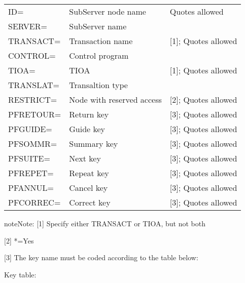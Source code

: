 \documentclass[letterpaper,10pt,english]{sphinxmanual}
\begin{document}
\begin{savenotes}\sphinxattablestart
\centering
\begin{tabulary}{\linewidth}[t]{|T|T|T|}
\hline
{}\relax &\relax &\relax \\
\hline
ID=
&
SubServer node name
&
Quotes allowed
\\
\hline
SERVER=
&
SubServer name
&\\
\hline
TRANSACT=
&
Transaction name
&
{[}1{]}; Quotes allowed
\\
\hline
CONTROL=
&
Control program
&\\
\hline
TIOA=
&
TIOA
&
{[}1{]}; Quotes allowed
\\
\hline
TRANSLAT=
&
Transaltion type
&\\
\hline
RESTRICT=
&
Node with reserved
access
&
{[}2{]}; Quotes allowed
\\
\hline
PFRETOUR=
&
Return key
&
{[}3{]}; Quotes allowed
\\
\hline
PFGUIDE=
&
Guide key
&
{[}3{]}; Quotes allowed
\\
\hline
PFSOMMR=
&
Summary key
&
{[}3{]}; Quotes allowed
\\
\hline
PFSUITE=
&
Next key
&
{[}3{]}; Quotes allowed
\\
\hline
PFREPET=
&
Repeat key
&
{[}3{]}; Quotes allowed
\\
\hline
PFANNUL=
&
Cancel key
&
{[}3{]}; Quotes allowed
\\
\hline
PFCORREC=
&
Correct key
&
{[}3{]}; Quotes allowed
\\
\hline
\end{tabulary}
\par
\sphinxattableend\end{savenotes}

\begin{sphinxadmonition}{note}{Note:}
{[}1{]}  Specify either TRANSACT or TIOA, but not both

{[}2{]}  *=Yes

{[}3{]}  The key name must be coded according to the table below:
\end{sphinxadmonition}

Key table:
\end{document}
